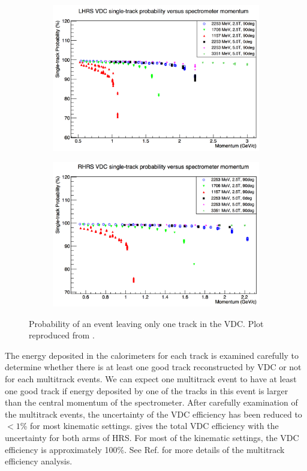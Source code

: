 \begin{figure}[b!]
  \centering
  \begin{subfigure}[t]{0.49\textwidth}
    \includegraphics[width=\textwidth]{figs/single-track-left.png}
  \end{subfigure}
  \begin{subfigure}[t]{0.49\textwidth}
    \includegraphics[width=\textwidth]{figs/single-track-right.png}
  \end{subfigure}
  \caption[Probability of an event leaving only one track in the VDC.]{Probability of an event leaving only one track in the VDC. Plot reproduced from \cite{Liu2013}. \label{C7S2F1}}
\end{figure}

The energy deposited in the calorimeters for each track is examined carefully to determine whether there is at least one good track reconstructed by VDC or not for each multitrack events. We can expect one multitrack event to have at least one good track if energy deposited by one of the tracks in this event is larger than the central momentum of the spectrometer. After carefully examination of the multitrack events, the uncertainty of the VDC efficiency has been reduced to $<1$\% for most kinematic settings.  gives the total VDC efficiency with the uncertainty for both arms of HRS. For most of the kinematic settings, the VDC efficiency is approximately 100\%. See Ref. \cite{Liu2013} for more details of the multitrack efficiency analysis.

